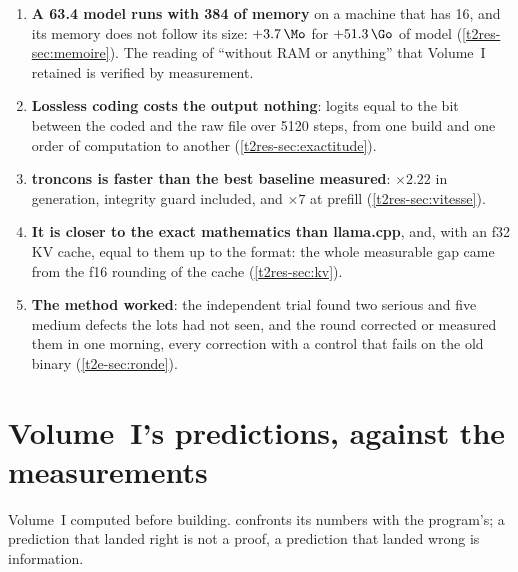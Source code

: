 \begin{enumerate}
\item \textbf{A \SI{63.4}{\Go} model runs with \SI{384}{\Mo} of memory} on a machine that has 16, and its memory does not follow its size: $+\SI{3.7}{\Mo}$ for $+\SI{51.3}{\Go}$ of model (\cref{t2res-sec:memoire}). The reading of ``without RAM or anything'' that Volume~I retained is verified by measurement.
\item \textbf{Lossless coding costs the output nothing}: logits equal to the bit between the coded and the raw file over \num{5120} steps, from one build and one order of computation to another (\cref{t2res-sec:exactitude}).
\item \textbf{troncons is faster than the best baseline measured}: $\times 2.22$ in generation, integrity guard included, and $\times 7$ at prefill (\cref{t2res-sec:vitesse}).
\item \textbf{It is closer to the exact mathematics than llama.cpp}, and, with an f32 KV cache, equal to them up to the format: the whole measurable gap came from the f16 rounding of the cache (\cref{t2res-sec:kv}).
\item \textbf{The method worked}: the independent trial found two serious and five medium defects the lots had not seen, and the round corrected or measured them in one morning, every correction with a control that fails on the old binary (\cref{t2e-sec:ronde}).
\end{enumerate}

\section{Volume~I's predictions, against the measurements}\label{t2d-sec:predictions}

Volume~I computed before building.  confronts its numbers with the program's; a prediction that landed right is not a proof, a prediction that landed wrong is information.

